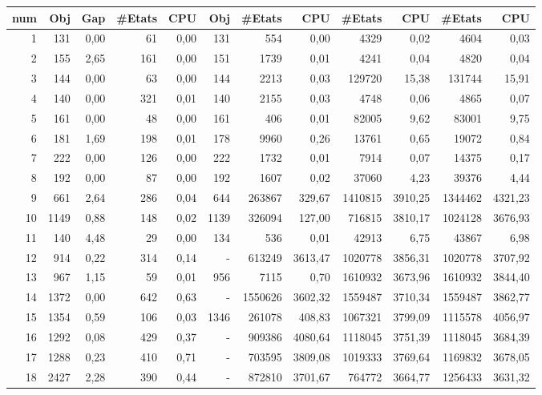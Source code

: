 \begin{table}[H]
\begin{tabular}{|r|rrrr|rrr|rr|rr|}
		\rowcolor{cyan}	\textbf{num} &\textbf{Obj} & \textbf{Gap} & \textbf{\#Etats} & \textbf{CPU} &\textbf{Obj} & \textbf{\#Etats} & \textbf{CPU}  & \textbf{\#Etats} & \textbf{CPU}  & \textbf{\#Etats} & \textbf{CPU} \\ \hline
		\midrule
	1	&	131	&	0,00	&	61	&	0,00	&	131	&	554	&	0,00	&	4329	&	0,02	&	4604	&	0,03	\\ \hline
	2	&	155	&	2,65	&	161	&	0,00	&	151	&	1739	&	0,01	&	4241	&	0,04	&	4820	&	0,04	\\ \hline
	3	&	144	&	0,00	&	63	&	0,00	&	144	&	2213	&	0,03	&	129720	&	15,38	&	131744	&	15,91	\\ \hline
	4	&	140	&	0,00	&	321	&	0,01	&	140	&	2155	&	0,03	&	4748	&	0,06	&	4865	&	0,07	\\ \hline
	5	&	161	&	0,00	&	48	&	0,00	&	161	&	406	&	0,01	&	82005	&	9,62	&	83001	&	9,75	\\ \hline
	6	&	181	&	1,69	&	198	&	0,01	&	178	&	9960	&	0,26	&	13761	&	0,65	&	19072	&	0,84	\\ \hline
	7	&	222	&	0,00	&	126	&	0,00	&	222	&	1732	&	0,01	&	7914	&	0,07	&	14375	&	0,17	\\ \hline
	8	&	192	&	0,00	&	87	&	0,00	&	192	&	1607	&	0,02	&	37060	&	4,23	&	39376	&	4,44	\\ \hline
	9	&	661	&	2,64	&	286	&	0,04	&	644	&	263867	&	329,67	&	1410815	&	3910,25	&	1344462	&	4321,23	\\ \hline
	10	&	1149	&	0,88	&	148	&	0,02	&	1139	&	326094	&	127,00	&	716815	&	3810,17	&	1024128	&	3676,93	\\ \hline
	11	&	140	&	4,48	&	29	&	0,00	&	134	&	536	&	0,01	&	42913	&	6,75	&	43867	&	6,98	\\ \hline
	12	&	914	&	0,22	&	314	&	0,14	&	-	&	613249	&	3613,47	&	1020778	&	3856,31	&	1020778	&	3707,92	\\ \hline
	13	&	967	&	1,15	&	59	&	0,01	&	956	&	7115	&	0,70	&	1610932	&	3673,96	&	1610932	&	3844,40	\\ \hline
	14	&	1372	&	0,00	&	642	&	0,63	&	-	&	1550626	&	3602,32	&	1559487	&	3710,34	&	1559487	&	3862,77	\\ \hline
	15	&	1354	&	0,59	&	106	&	0,03	&	1346	&	261078	&	408,83	&	1067321	&	3799,09	&	1115578	&	4056,97	\\ \hline
	16	&	1292	&	0,08	&	429	&	0,37	&	-	&	909386	&	4080,64	&	1118045	&	3751,39	&	1118045	&	3684,39	\\ \hline
	17	&	1288	&	0,23	&	410	&	0,71	&	-	&	703595	&	3809,08	&	1019333	&	3769,64	&	1169832	&	3678,05	\\ \hline
	18	&	2427	&	2,28	&	390	&	0,44	&	-	&	872810	&	3701,67	&	764772	&	3664,77	&	1256433	&	3631,32	\\ \hline

\end{tabular}
\end{table}
